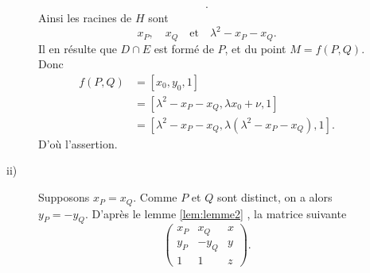 \begin{demonstration}
\begin{description}
\begin{description}
\begin{align*}
           .\end{align*} 
           Ainsi les racines de $H$ sont
           \[
           x_P, \quad x_Q \quad \text{et} \quad \lambda^2 - x_P - x_Q
           .\] 
           Il en résulte que $D \cap E$ est formé de $P$, et du point $M = f(P,Q)$.
           Donc  
           \begin{align*}
               f(P,Q) &= \left[ x_0, y_0, 1 \right] \\
                      &= \left[ \lambda^2 - x_P - x_Q, \lambda x_0 + \nu, 1 \right] \\
                      &= \left[ \lambda^2 - x_P - x_Q, \lambda\left( \lambda^2 - x_P - x_Q \right), 1\right]
           .\end{align*}
           D'où l'assertion.
       \item[ii)] Supposons $x_P = x_Q$. Comme $P$ et $Q$ sont distinct, on a alors $y_P = - y_Q$.
               D'après le lemme \ref{lem:lemme2} , la matrice suivante
               \[
                   \begin{pmatrix} x_P & x_Q & x \\
                   y_P & - y_Q & y \\
               1 & 1 & z
           \end{pmatrix} 
               .\] 


\end{description}
\end{description}
\end{demonstration}
